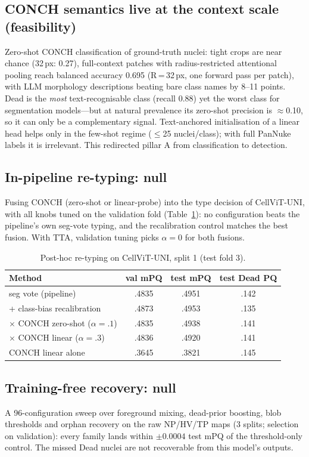 \documentclass[11pt]{article}
\begin{document}
\subsection{CONCH semantics live at the context scale (feasibility)}
Zero-shot CONCH classification of ground-truth nuclei: tight crops are near chance (32\,px:
0.27), full-context patches with radius-restricted attentional pooling reach balanced accuracy
0.695 (R\,=\,32\,px, one forward pass per patch), with LLM morphology descriptions beating bare
class names by 8--11 points. Dead is the \emph{most} text-recognisable class (recall 0.88) yet
the worst class for segmentation models---but at natural prevalence its zero-shot precision is
$\approx$0.10, so it can only be a complementary signal. Text-anchored initialisation of a
linear head helps only in the few-shot regime ($\le$25 nuclei/class); with full PanNuke labels
it is irrelevant. This redirected pillar A from classification to detection.

\subsection{In-pipeline re-typing: null}
Fusing CONCH (zero-shot or linear-probe) into the type decision of CellViT-UNI, with all knobs
tuned on the validation fold (Table~\ref{tab:retype}): no configuration beats the pipeline's own
seg-vote typing, and the recalibration control matches the best fusion. With TTA, validation
tuning picks $\alpha=0$ for both fusions.

\begin{table}[t]
\centering\small
\caption{Post-hoc re-typing on CellViT-UNI, split 1 (test fold 3).}
\label{tab:retype}
\begin{tabular}{lccc}
\toprule
Method & val mPQ & test mPQ & test Dead PQ \\
\midrule
seg vote (pipeline)              & .4835 & .4951 & .142 \\
+ class-bias recalibration       & .4873 & .4953 & .135 \\
$\times$ CONCH zero-shot ($\alpha{=}.1$) & .4835 & .4938 & .141 \\
$\times$ CONCH linear ($\alpha{=}.3$)    & .4836 & .4920 & .141 \\
CONCH linear alone               & .3645 & .3821 & .145 \\
\bottomrule
\end{tabular}
\end{table}

\subsection{Training-free recovery: null}
A 96-configuration sweep over foreground mixing, dead-prior boosting, blob thresholds and
orphan recovery on the raw NP/HV/TP maps (3 splits; selection on validation): every family lands
within $\pm0.0004$ test mPQ of the threshold-only control. The missed Dead nuclei are not
recoverable from this model's outputs.
\end{document}
